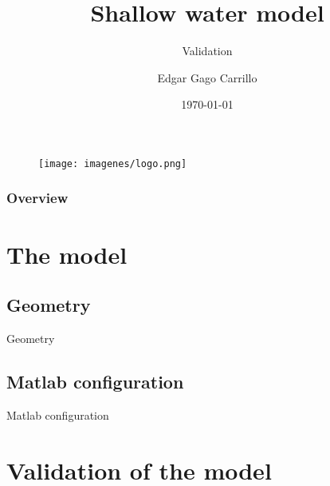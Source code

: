 \documentclass{beamer}
\title[Model validation]{Shallow water model} %
\subtitle{Validation}%
\author{Edgar Gago Carrillo} %
\institute[ESEIAAT] %
{
Polytechnic University of Catalonia \\ %
\medskip
\textit{edgargc.upc@gmail.com} %
}
\date{\today} %
\begin{document}
\begin{frame}
\titlepage %
\begin{figure}
    \centering
    \texttt{[image: imagenes/logo.png]}
\end{figure}
\end{frame}

\begin{frame}
\frametitle{Overview} %
\tableofcontents %
\end{frame}


\section{The model}

\subsection{Geometry} 
\begin{frame}{Geometry}

\end{frame}

\subsection{Matlab configuration}
\begin{frame}{Matlab configuration}

\end{frame}

\section{Validation of the model }
\end{document}

